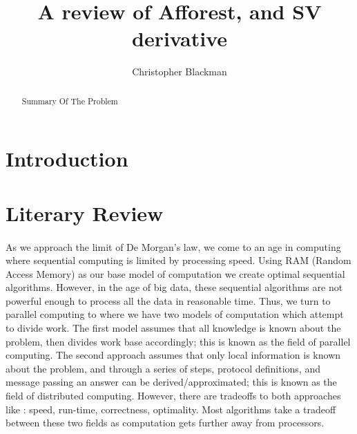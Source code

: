 \documentclass[]{article}
\begin{document}
\title{A review of Afforest, and SV derivative}
\author{Christopher Blackman}

\maketitle
\begin{abstract}
Summary Of The Problem
\end{abstract}

\newpage
\section{Introduction}

\section{Literary Review}
\paragraph{}
As we approach the limit of De Morgan's law, we come to an age in computing where sequential computing is limited by processing speed. Using RAM (Random Access Memory) as our base model of computation we create optimal sequential algorithms. However, in the age of big data, these sequential algorithms are not powerful enough to process all the data in reasonable time. Thus, we turn to parallel computing to where we have two models of computation which attempt to divide work. The first model assumes that all knowledge is known about the problem, then divides work base accordingly; this is known as the field of parallel computing. The second approach assumes that only local information is known about the problem, and through a series of steps, protocol definitions, and message passing an answer can be derived/approximated; this is known as the field of distributed computing. However, there are tradeoffs to both approaches like : speed, run-time, correctness, optimality. Most algorithms take a tradeoff between these two fields as computation gets further away from processors.
\end{document}
